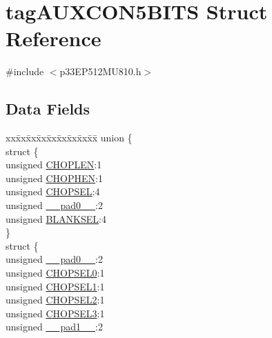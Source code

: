 \hypertarget{structtag_a_u_x_c_o_n5_b_i_t_s}{}\section{tag\+A\+U\+X\+C\+O\+N5\+B\+I\+TS Struct Reference}
\label{structtag_a_u_x_c_o_n5_b_i_t_s}


{\ttfamily \#include $<$p33\+E\+P512\+M\+U810.\+h$>$}

\subsection*{Data Fields}
\begin{DoxyCompactItemize}
\item 
\begin{tabbing}
xx\=xx\=xx\=xx\=xx\=xx\=xx\=xx\=xx\=\kill
union \{\\
\>struct \{\\
\>\>unsigned \hyperlink{structtag_a_u_x_c_o_n5_b_i_t_s_a3ef61325b83d3685e2364392dd43dd06}{CHOPLEN}:1\\
\>\>unsigned \hyperlink{structtag_a_u_x_c_o_n5_b_i_t_s_a38243e11a4372e45b55166fcec4322fa}{CHOPHEN}:1\\
\>\>unsigned \hyperlink{structtag_a_u_x_c_o_n5_b_i_t_s_aafc704d0a50b4ba0c019d33514cb7782}{CHOPSEL}:4\\
\>\>unsigned \hyperlink{structtag_a_u_x_c_o_n5_b_i_t_s_adf71f3d8410c1f1dbbc96680a92c49af}{\_\_pad0\_\_}:2\\
\>\>unsigned \hyperlink{structtag_a_u_x_c_o_n5_b_i_t_s_a16dd126500ffc8232d3b8e619c4406a2}{BLANKSEL}:4\\
\>\} \\
\>struct \{\\
\>\>unsigned \hyperlink{structtag_a_u_x_c_o_n5_b_i_t_s_adf71f3d8410c1f1dbbc96680a92c49af}{\_\_pad0\_\_}:2\\
\>\>unsigned \hyperlink{structtag_a_u_x_c_o_n5_b_i_t_s_acc4daaf21ff4590b40d3f25dad388167}{CHOPSEL0}:1\\
\>\>unsigned \hyperlink{structtag_a_u_x_c_o_n5_b_i_t_s_a5be3cb702a6c27dd28ee2f7bb142c88c}{CHOPSEL1}:1\\
\>\>unsigned \hyperlink{structtag_a_u_x_c_o_n5_b_i_t_s_ae9a19a5d1e40ae671a2b05fa09e77c10}{CHOPSEL2}:1\\
\>\>unsigned \hyperlink{structtag_a_u_x_c_o_n5_b_i_t_s_a6bcb1f80b40842c9ebd3c9d76d4c196f}{CHOPSEL3}:1\\
\>\>unsigned \hyperlink{structtag_a_u_x_c_o_n5_b_i_t_s_acaf2d0924a107ec6e8d2e31febaf66f9}{\_\_pad1\_\_}:2\\

\end{tabbing}
\end{DoxyCompactItemize}
